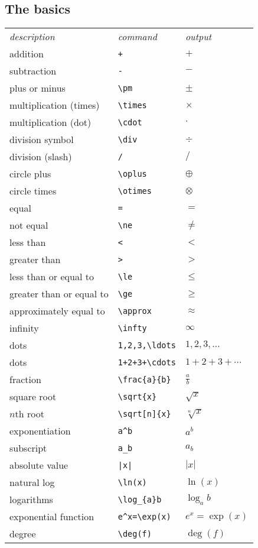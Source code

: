 \begin{multicols}{3}
\subsection{The basics}
\begin{tabular}{lll}
\emph{description} & \emph{command} & \emph{output}\\
addition & \verb!+! & $+$\\
subtraction & \verb!-! & $-$\\
plus or minus & \verb!\pm! & $\pm$\\
multiplication (times) & \verb!\times! & $\times$\\
multiplication (dot) & \verb!\cdot! & $\cdot$\\
division symbol & \verb!\div! & $\div$\\
division (slash) & \verb!/! & $/$\\
circle plus & \verb!\oplus! & $\oplus$\\
circle times & \verb!\otimes! & $\otimes$\\
equal & \verb!=! & $=$\\
not equal & \verb!\ne! & $\ne$\\
less than & \verb!<! & $<$\\
greater than & \verb!>! & $>$\\
less than or equal to & \verb!\le! & $\le$\\
greater than or equal to & \verb!\ge! & $\ge$\\
approximately equal to & \verb!\approx! & $\approx$\\
infinity & \verb!\infty! & $\infty$\\
dots & \verb!1,2,3,\ldots! & $1,2,3,\ldots$\\
dots & \verb!1+2+3+\cdots! & $1+2+3+\cdots$\\
fraction & \verb!\frac{a}{b}! & $\frac{a}{b}$\\
square root & \verb!\sqrt{x}! & $\sqrt{x}$\\
$n$th root & \verb!\sqrt[n]{x}! & $\sqrt[n]{x}$\\
exponentiation & \verb!a^b! & $a^{b}$\\
subscript & \verb!a_b! & $a_{b}$\\
absolute value & \verb!|x|! & $|x|$\\
natural log  & \verb!\ln(x)! & $\ln(x)$\\
logarithms & \verb!\log_{a}b! & $\log_{a}b$\\
exponential function & \verb!e^x=\exp(x)! & $e^{x}=\exp(x)$\\
degree & \verb!\deg(f)! & $\deg(f)$\\
\end{tabular}
\newpage


\end{multicols}
